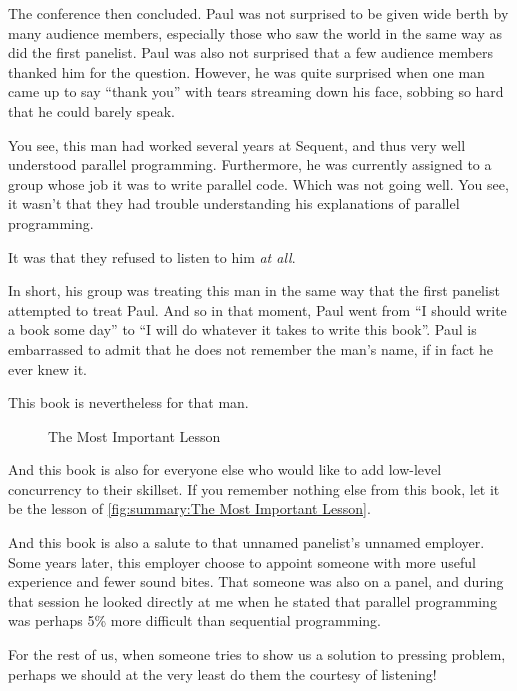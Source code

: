 The conference then concluded.
Paul was not surprised to be given wide berth by many audience members,
especially those who saw the world in the same way as did the first panelist.
Paul was also not surprised that a few audience members thanked him for
the question.
However, he was quite surprised when one man came up to say ``thank
you'' with tears streaming down his face, sobbing so hard that he could
barely speak.

You see, this man had worked several years at Sequent, and thus very
well understood parallel programming.
Furthermore, he was currently assigned to a group whose job it was to
write parallel code.
Which was not going well.
You see, it wasn't that they had trouble understanding his explanations
of parallel programming.

It was that they refused to listen to him \emph{at all}.

In short, his group was treating this man in the same way that the first
panelist attempted to treat Paul.
And so in that moment, Paul went from ``I should write a book some day''
to ``I will do whatever it takes to write this book''.
Paul is embarrassed to admit that he does not remember the man's name,
if in fact he ever knew it.

This book is nevertheless for that man.

\begin{figure}
\centering
{}
\caption{The Most Important Lesson}
\end{figure}

And this book is also for everyone else who would like to add low-level
concurrency to their skillset.
If you remember nothing else from this book, let it be the lesson of
\cref{fig:summary:The Most Important Lesson}.

And this book is also a salute to that unnamed panelist's unnamed employer.
Some years later, this employer choose to appoint someone with more
useful experience and fewer sound bites.
That someone was also on a panel, and during that session he looked
directly at me when he stated that parallel programming was perhaps 5\%
more difficult than sequential programming.

For the rest of us, when someone tries to show us a solution to pressing
problem, perhaps we should at the very least do them the courtesy of
listening!
